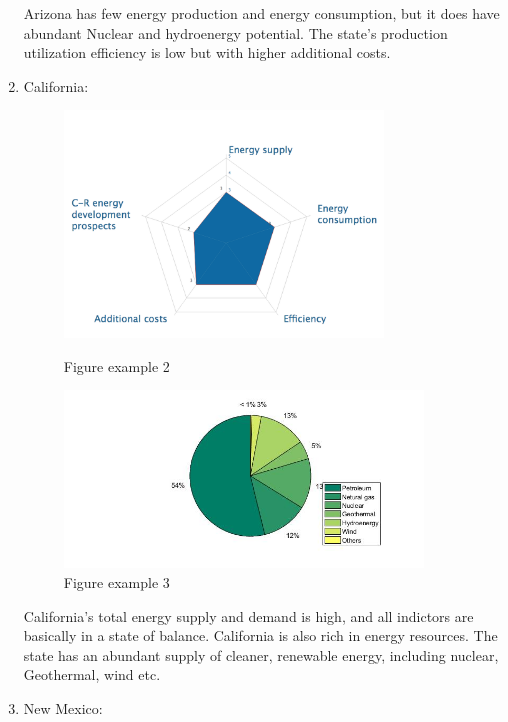 \documentclass{mcmthesis}
\begin{document}
\begin{enumerate}
          
          
          
          
        
     Arizona has few energy production and energy consumption, but it does have abundant Nuclear and hydroenergy potential. The state’s production utilization efficiency is low but with higher additional costs.
    \item California:
    
    \begin{figure}[h]
          \begin{minipage}[h]{0.6\linewidth}
          \centering
          \includegraphics[width=0.8\textwidth]{CA.png}
          \caption{Figure example 2}
          \end{minipage}
          \begin{minipage}[h]{0.6\linewidth}
          \centering
          \includegraphics[width=0.9\textwidth]{CA1.jpg}
          \caption{Figure example 3}
          \end{minipage}
          \end{figure}
    
    

     California’s total energy supply and demand is high, and all indictors are basically in a state of balance. California is also rich in energy resources. The state has an abundant supply of cleaner, renewable energy, including nuclear, Geothermal, wind etc.
    \item New Mexico:
    

\end{enumerate}
\end{document}

